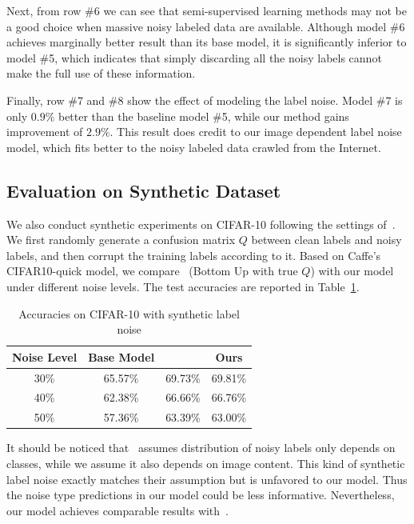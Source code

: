 \documentclass[10pt,twocolumn,letterpaper]{article}
\begin{document}
Next, from row \#6 we can see that semi-supervised learning methods may not be a good choice when massive noisy labeled data are available. Although model \#6 achieves marginally better result than its base model, it is significantly inferior to model \#5, which indicates that simply discarding all the noisy labels cannot make the full use of these information.

Finally, row \#7 and \#8 show the effect of modeling the label noise. Model \#7 is only $0.9\%$ better than the baseline model \#5, while our method gains improvement of $2.9\%$. This result does credit to our image dependent label noise model, which fits better to the noisy labeled data crawled from the Internet.

\subsection{Evaluation on Synthetic Dataset} %
\label{sub:evaluation_on_synthetic_dataset}
We also conduct synthetic experiments on CIFAR-10 following the settings of~\cite{sukhbaatar2014learning}. We first randomly generate a confusion matrix $Q$ between clean labels and noisy labels, and then corrupt the training labels according to it. Based on Caffe's CIFAR10-quick model, we compare~\cite{sukhbaatar2014learning} (Bottom Up with true $Q$) with our model under different noise levels. The test accuracies are reported in Table~\ref{tab:accuracy_synthetic}.

\begin{table}
\begin{center}
\begin{tabular}{c|c|c|c}
\hline
Noise Level & Base Model & \cite{sukhbaatar2014learning} & Ours \\
\hline\hline
30\% & 65.57\% & 69.73\% & 69.81\% \\
\hline
40\% & 62.38\% & 66.66\% & 66.76\% \\
\hline
50\% & 57.36\% & 63.39\% & 63.00\% \\
\hline
\end{tabular}
\end{center}
\caption{Accuracies on CIFAR-10 with synthetic label noise}
\label{tab:accuracy_synthetic}
\end{table}

It should be noticed that~\cite{sukhbaatar2014learning} assumes distribution of noisy labels only depends on classes, while we assume it also depends on image content. This kind of synthetic label noise exactly matches their assumption but is unfavored to our model. Thus the noise type predictions in our model could be less informative. Nevertheless, our model achieves comparable results with~\cite{sukhbaatar2014learning}.
\end{document}

